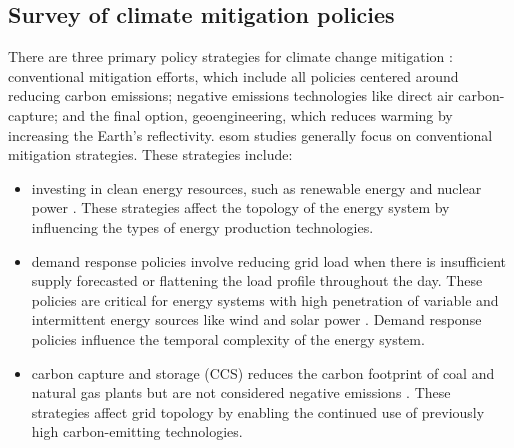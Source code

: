 \subsection{Survey of climate mitigation policies}

There are three primary policy strategies for climate change mitigation \cite{fawzy_strategies_2020}:
conventional mitigation efforts, which include all policies centered around
reducing carbon emissions; negative emissions technologies like direct air
carbon-capture; and the final option, geoengineering, which reduces warming by
increasing the Earth’s reflectivity. \gls{esom} studies generally focus on
conventional mitigation strategies. These strategies include:
\begin{itemize}
  \item investing in clean energy resources, such as renewable energy and nuclear power
  \cite{fawzy_strategies_2020}. These strategies affect the topology of the energy
  system by influencing the types of energy production technologies.
  \item demand response policies involve reducing grid load when there is insufficient
  supply forecasted or flattening the load profile throughout the day. These policies
  are critical for energy systems with high penetration of variable and intermittent
  energy sources like wind and solar power \cite{bouckaert_expanding_2014,
  kuzemko_policies_2017}. Demand response policies influence the temporal
  complexity of the energy system.
  \item carbon capture and storage (CCS) reduces the carbon footprint of coal and
  natural gas plants but are not considered negative emissions \cite{fawzy_strategies_2020}.
  These strategies affect grid topology by enabling the continued use of previously
  high carbon-emitting technologies.
\end{itemize}

